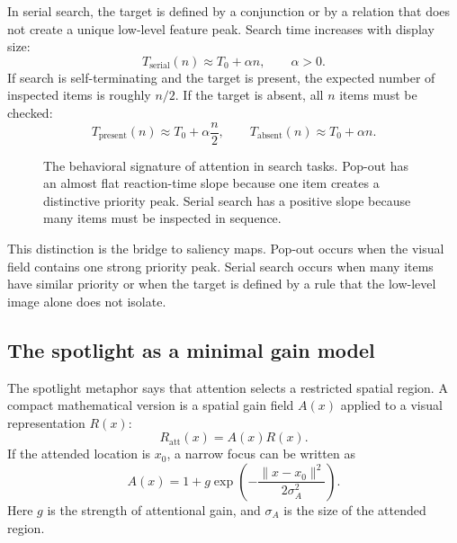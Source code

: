 In serial search, the target is defined by a conjunction or by a relation that does not create a unique low-level feature peak. Search time increases with display size:
\[
T_{\mathrm{serial}}(n) \approx T_0 + \alpha n,
\qquad
\alpha > 0.
\]
If search is self-terminating and the target is present, the expected number of inspected items is roughly \(n/2\). If the target is absent, all \(n\) items must be checked:
\[
T_{\mathrm{present}}(n) \approx T_0 + \alpha \frac{n}{2},
\qquad
T_{\mathrm{absent}}(n) \approx T_0 + \alpha n.
\]

\begin{figure}[!htbp]
\centering
{}
\caption{The behavioral signature of attention in search tasks. Pop-out has an almost flat reaction-time slope because one item creates a distinctive priority peak. Serial search has a positive slope because many items must be inspected in sequence.}
\end{figure}

This distinction is the bridge to saliency maps. Pop-out occurs when the visual field contains one strong priority peak. Serial search occurs when many items have similar priority or when the target is defined by a rule that the low-level image alone does not isolate.

\subsection{The spotlight as a minimal gain model}

The spotlight metaphor says that attention selects a restricted spatial region. A compact mathematical version is a spatial gain field \(A(x)\) applied to a visual representation \(R(x)\):
\[
R_{\mathrm{att}}(x) = A(x)R(x).
\]
If the attended location is \(x_0\), a narrow focus can be written as
\[
A(x)
=
1 + g\exp\left(-\frac{\|x-x_0\|^2}{2\sigma_A^2}\right).
\]
Here \(g\) is the strength of attentional gain, and \(\sigma_A\) is the size of the attended region.

